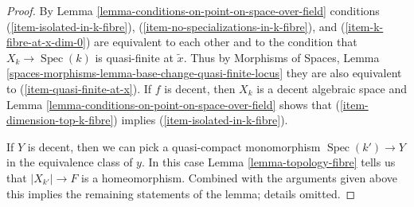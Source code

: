 \documentclass{stacks-project}
\theoremstyle{plain}
\theoremstyle{definition}
\theoremstyle{remark}
\numberwithin{equation}{subsection}
\def\Spec{\mathop{\mathrm{Spec}}}
\begin{document}
\begin{proof}
By Lemma \ref{lemma-conditions-on-point-on-space-over-field} conditions
(\ref{item-isolated-in-k-fibre}),
(\ref{item-no-specializations-in-k-fibre}), and (\ref{item-k-fibre-at-x-dim-0})
are equivalent to each other and to the condition that
$X_k \to \Spec(k)$ is quasi-finite at $\tilde x$.
Thus by Morphisms of Spaces, Lemma
\ref{spaces-morphisms-lemma-base-change-quasi-finite-locus}
they are also equivalent to (\ref{item-quasi-finite-at-x}).
If $f$ is decent, then $X_k$ is a decent algebraic space and
Lemma \ref{lemma-conditions-on-point-on-space-over-field}
shows that (\ref{item-dimension-top-k-fibre}) implies
(\ref{item-isolated-in-k-fibre}).

\medskip\noindent
If $Y$ is decent, then we can pick a quasi-compact monomorphism
$\Spec(k') \to Y$ in the equivalence class of $y$. In this case
Lemma \ref{lemma-topology-fibre}
tells us that $|X_{k'}| \to F$ is a homeomorphism.
Combined with the arguments given above this implies
the remaining statements of the lemma; details omitted.
\end{proof}
\end{document}

